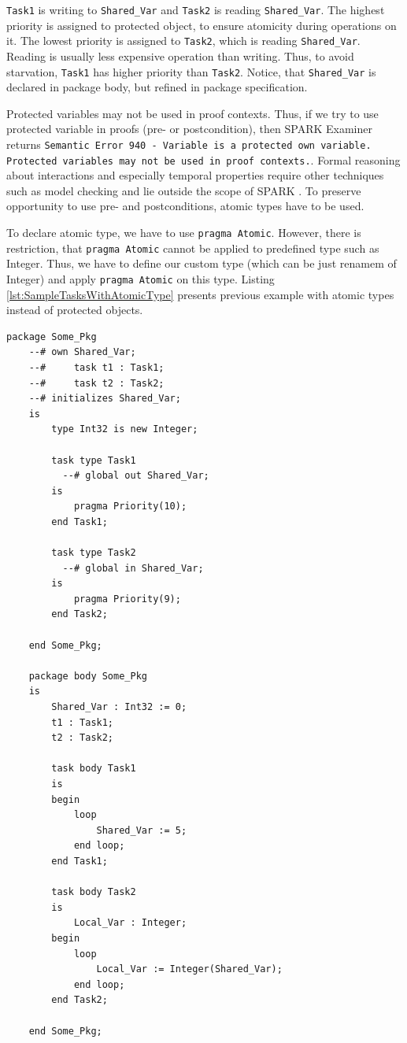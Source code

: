 \lstinline{Task1} is writing to \lstinline{Shared_Var} and \lstinline{Task2} is reading \lstinline{Shared_Var}. The highest priority is assigned to protected object, to ensure atomicity during operations on it. The lowest priority is assigned to \lstinline{Task2}, which is reading \lstinline{Shared_Var}. Reading is usually less expensive operation than writing. Thus, to avoid starvation, \lstinline{Task1} has higher priority than \lstinline{Task2}. Notice, that \lstinline{Shared_Var} is declared in package body, but refined in package specification.

Protected variables may not be used in proof contexts. Thus, if we try to use protected variable in proofs (pre- or postcondition), then SPARK Examiner returns \lstinline{Semantic Error 940 - Variable is a protected own variable. Protected variables may not be used in proof contexts.}. Formal reasoning about interactions and especially temporal properties require other techniques such as model checking and lie outside the scope of SPARK \cite{Barnes:Book}. To preserve opportunity to use pre- and postconditions, atomic types have to be used.

To declare atomic type, we have to use \lstinline{pragma Atomic}. However, there is restriction, that \lstinline{pragma Atomic} cannot be applied to predefined type such as Integer. Thus, we have to define our custom type (which can be just renamem of Integer) and apply \lstinline{pragma Atomic} on this type. Listing \ref{lst:SampleTasksWithAtomicType} presents previous example with atomic types instead of protected objects.

\singlespacing
\begin{lstlisting}[frame=single, gobble=0, caption={Sample tasks with atomic type}, label={lst:SampleTasksWithAtomicType}]
	package Some_Pkg
	--# own Shared_Var;
	--#     task t1 : Task1;
	--#     task t2 : Task2;
	--# initializes Shared_Var;
	is
	    type Int32 is new Integer;
	    
	    task type Task1
	      --# global out Shared_Var;
	    is
	        pragma Priority(10);
	    end Task1;

	    task type Task2
	      --# global in Shared_Var;
	    is
	        pragma Priority(9);
	    end Task2;

	end Some_Pkg;

	package body Some_Pkg
	is    
	    Shared_Var : Int32 := 0;
	    t1 : Task1;
	    t2 : Task2;

	    task body Task1
	    is
	    begin
	        loop
	            Shared_Var := 5;
	        end loop;
	    end Task1;

	    task body Task2
	    is
	        Local_Var : Integer;
	    begin
	        loop
	            Local_Var := Integer(Shared_Var);
	        end loop;
	    end Task2;

	end Some_Pkg;
\end{lstlisting}
\doublespacing


